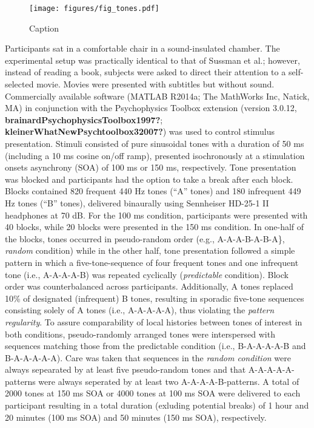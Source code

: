 \documentclass[twoside, man, a4paper,12pt, nofontenc]{apa7}
\begin{document}
\begin{figure}
\centering
\texttt{[image: figures/fig\_tones.pdf]}
\caption{Caption}
\end{figure}

Participants sat in a comfortable chair in a sound-insulated chamber.
The experimental setup was practically identical to that of Sussman et
al.; however, instead of reading a book, subjects were asked to direct
their attention to a self-selected movie. Movies were presented with
subtitles but without sound. Commercially available software (MATLAB
R2014a; The MathWorks Inc, Natick, MA) in conjunction with the
Psychophysics Toolbox extension (version 3.0.12,
\textbf{brainardPsychophysicsToolbox1997?};
\textbf{kleinerWhatNewPsychtoolbox32007?}) was used to control stimulus
presentation. Stimuli consisted of pure sinusoidal tones with a duration
of 50 ms (including a 10 ms cosine on/off ramp), presented isochronously
at a stimulation onsets asynchrony (SOA) of 100 ms or 150 ms,
respectively. Tone presentation was blocked and participants had the
option to take a break after each block. Blocks contained 820 frequent
440 Hz tones (\enquote{A} tones) and 180 infrequent 449 Hz tones
(\enquote{B} tones), delivered binaurally using Sennheiser HD-25-1 II
headphones at 70 dB. For the 100 ms condition, participants were
presented with 40 blocks, while 20 blocks were presented in the 150 ms
condition. In one-half of the blocks, tones occurred in pseudo-random
order (e.g., A-A-A-B-A-B-A\}, \emph{random} condition) while in the
other half, tone presentation followed a simple pattern in which a
five-tone-sequence of four frequent tones and one infrequent tone (i.e.,
A-A-A-A-B) was repeated cyclically (\emph{predictable} condition). Block
order was counterbalanced across participants. Additionally, A tones
replaced 10\% of designated (infrequent) B tones, resulting in sporadic
five-tone sequences consisting solely of A tones (i.e., A-A-A-A-A), thus
violating the \emph{pattern regularity}. To assure comparability of
local histories between tones of interest in both conditions,
pseudo-randomly arranged tones were interspersed with sequences matching
those from the predictable condition (i.e., B-A-A-A-A-B and
B-A-A-A-A-A). Care was taken that sequences in the \emph{random
condition} were always sepearated by at least five pseudo-random tones
and that A-A-A-A-A-patterns were always seperated by at least two
A-A-A-A-B-patterns. A total of 2000 tones at 150 ms SOA or 4000 tones at
100 ms SOA were delivered to each participant resulting in a total
duration (exluding potential breaks) of 1 hour and 20 minutes (100 ms
SOA) and 50 minutes (150 ms SOA), respectively.
\end{document}

